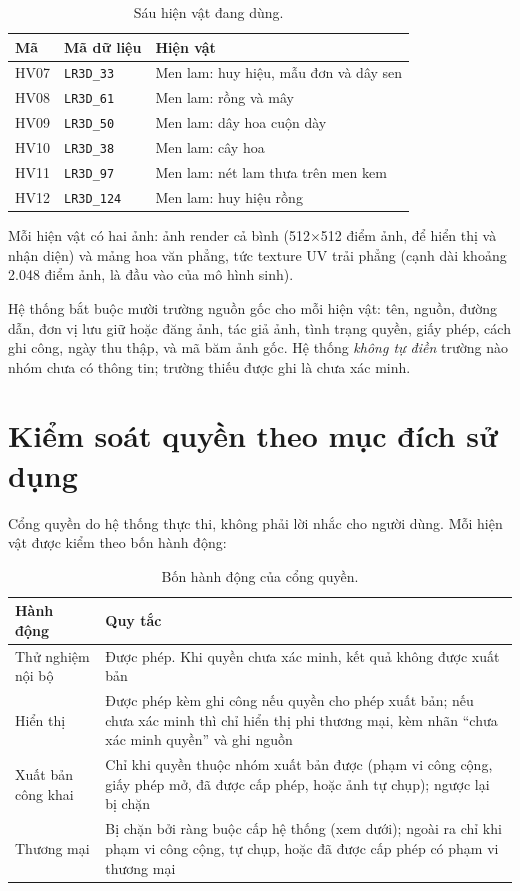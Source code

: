 \documentclass[12pt,a4paper]{report}
\begin{document}
\begin{table}[H]
\centering
\small
\caption{Sáu hiện vật đang dùng.}
\label{tab:hienvat}
\begin{tabular}{llp{8cm}}
\toprule
\textbf{Mã} & \textbf{Mã dữ liệu} & \textbf{Hiện vật} \\
\midrule
HV07 & \texttt{LR3D\_33} & Men lam: huy hiệu, mẫu đơn và dây sen \\
HV08 & \texttt{LR3D\_61} & Men lam: rồng và mây \\
HV09 & \texttt{LR3D\_50} & Men lam: dây hoa cuộn dày \\
HV10 & \texttt{LR3D\_38} & Men lam: cây hoa \\
HV11 & \texttt{LR3D\_97} & Men lam: nét lam thưa trên men kem \\
HV12 & \texttt{LR3D\_124} & Men lam: huy hiệu rồng \\
\bottomrule
\end{tabular}
\end{table}

Mỗi hiện vật có hai ảnh: ảnh render cả bình (512$\times$512 điểm ảnh, để hiển thị và nhận diện) và mảng hoa văn phẳng, tức texture UV trải phẳng (cạnh dài khoảng 2.048 điểm ảnh, là đầu vào của mô hình sinh).

Hệ thống bắt buộc mười trường nguồn gốc cho mỗi hiện vật: tên, nguồn, đường dẫn, đơn vị lưu giữ hoặc đăng ảnh, tác giả ảnh, tình trạng quyền, giấy phép, cách ghi công, ngày thu thập, và mã băm ảnh gốc. Hệ thống \emph{không tự điền} trường nào nhóm chưa có thông tin; trường thiếu được ghi là chưa xác minh.


\section{Kiểm soát quyền theo mục đích sử dụng}
\label{sec:rights}

Cổng quyền do hệ thống thực thi, không phải lời nhắc cho người dùng. Mỗi hiện vật được kiểm theo bốn hành động:

\begin{table}[H]
\centering
\small
\caption{Bốn hành động của cổng quyền.}
\label{tab:congquyen}
\begin{tabularx}{\textwidth}{>{\raggedright\arraybackslash}p{3.4cm}>{\raggedright\arraybackslash}X}
\toprule
\textbf{Hành động} & \textbf{Quy tắc} \\
\midrule
Thử nghiệm nội bộ & Được phép. Khi quyền chưa xác minh, kết quả không được xuất bản \\
Hiển thị & Được phép kèm ghi công nếu quyền cho phép xuất bản; nếu chưa xác minh thì chỉ hiển thị phi thương mại, kèm nhãn “chưa xác minh quyền” và ghi nguồn \\
Xuất bản công khai & Chỉ khi quyền thuộc nhóm xuất bản được (phạm vi công cộng, giấy phép mở, đã được cấp phép, hoặc ảnh tự chụp); ngược lại bị chặn \\
Thương mại & Bị chặn bởi ràng buộc cấp hệ thống (xem dưới); ngoài ra chỉ khi phạm vi công cộng, tự chụp, hoặc đã được cấp phép có phạm vi thương mại \\
\bottomrule
\end{tabularx}
\end{table}
\end{document}
